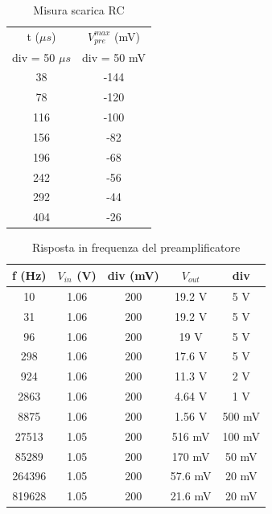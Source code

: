 \documentclass{article}
\begin{document}
\begin{table}[H]
    \centering
    \begin{tabular}{cc}
        \toprule
        t ($\mu s$)& $V_{pre}^{max}$ (mV) \\
        div = 50 $\mu s$ & div = 50 mV\\
        \midrule
        38 & -144 \\
        78 & -120 \\
        116 & -100 \\
        156 & -82 \\
        196 & -68 \\
        242 & -56 \\
        292 & -44 \\
        404 & -26 \\
        \bottomrule
    \end{tabular}
    \caption{Misura scarica RC}
\end{table}

\begin{table}[H]
    \centering
    \begin{tabular}{ccccc}
        \toprule
        f (Hz) & $V_{in}$ (V) & div (mV) & $V_{out}$ & div\\
        \midrule
        10 & 1.06 & 200 & 19.2 V & 5 V\\
        31 & 1.06 & 200 & 19.2 V& 5 V\\
        96 & 1.06 & 200 & 19 V& 5 V\\
        298 & 1.06 & 200 & 17.6 V& 5 V\\
        924 & 1.06 & 200 & 11.3 V& 2 V\\
        2863 & 1.06 & 200 & 4.64 V& 1 V\\
        8875 & 1.06 & 200 & 1.56 V& 500 mV\\
        27513 & 1.05 & 200 & 516 mV& 100 mV\\
        85289 & 1.05 & 200 & 170 mV& 50 mV\\
        264396 & 1.05 & 200 & 57.6 mV & 20 mV\\
        819628 & 1.05 & 200 & 21.6 mV& 20 mV\\
        \bottomrule
    \end{tabular}
    \caption{Risposta in frequenza del preamplificatore}
\end{table}
\end{document}
